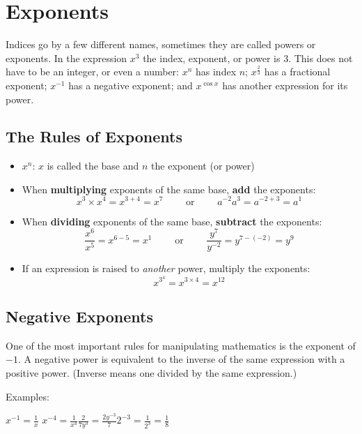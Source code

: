 \section*{Exponents}
Indices go by a few different names, sometimes they are called powers or exponents. In the expression $x^3$ the index, exponent, or power is $3$. This does not have to be an integer, or even a number: $x^n$ has index $n$; $x^{\frac{2}{3}}$ has a fractional exponent; $x^{-1}$ has a negative exponent; and $x^{\cos x}$ has another expression for its power.

\subsection*{The Rules of Exponents}
\begin{tcolorbox}
	\begin{itemize}
		\item $x^n$: $x$ is called the base and $n$ the exponent (or power)
		\item When \textbf{multiplying} exponents of the same base, \textbf{add} the exponents: \[x^3\times x^4=x^{3+4}=x^7\qquad\text{ or }\qquad a^{-2} a^3=a^{-2+3}=a^1\]
		\item When \textbf{dividing} exponents of the same base, \textbf{subtract} the exponents:\[\frac{x^6}{x^5}=x^{6-5}=x^1\qquad\text{ or }\qquad \frac{y^7}{y^{-2}}=y^{7-(-2)}=y^9\]
		\item If an expression is raised to \textit{another} power, multiply the exponents:
		\[ x^{3^4}=x^{3\times 4}=x^{12}\]
	\end{itemize}
\end{tcolorbox}	

\subsection*{Negative Exponents}
One of the most important rules for manipulating mathematics is the exponent of $-1$. A negative power is equivalent to the inverse of the same expression with a positive power. (Inverse means one divided by the same expression.)\\

\begin{tcolorbox}
	Examples:
	
	\hspace{1cm}$\displaystyle x^{-1}=\frac{1}{x}$ \hspace{2cm}$\displaystyle x^{-4}=\frac{1}{x^4}$\hspace{2cm}$\displaystyle\frac{2}{7y^3}=\frac{2y^{-3}}{7} $\hspace{2cm}$\displaystyle 2^{-3}=\frac{1}{2^3}=\frac{1}{8} $
\end{tcolorbox}	

